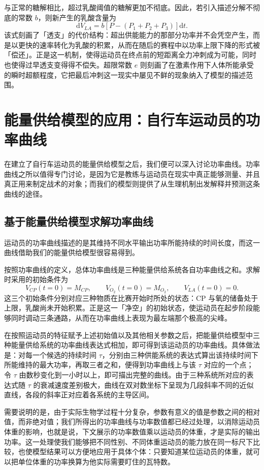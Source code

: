 \documentclass[11pt,a4paper]{ctexart}
\begin{document}
与正常的糖解相比，超过乳酸阈值的糖解更加不彻底。因此，若引入描述分解不彻底的常数 $b$，则新产生的乳酸含量为
\begin{equation}
\mathrm{d}V_{LA}=b\left[P-\left(P_1+P_2+P_3\right)\right]\mathrm{d}t.
\end{equation}
该式刻画了「透支」的代价结构：超出供能能力的那部分功率并不会凭空产生，而是以更快的速率转化为乳酸的积累，从而在随后的赛程中以功率上限下降的形式被「偿还」。正是这一机制，使得运动员在终点前的短距离全力冲刺成为可能，同时也使得过早透支变得得不偿失。超限常数 $e$ 则刻画了在激素作用下人体所能承受的瞬时超额程度，它把最后冲刺这一现实中屡见不鲜的现象纳入了模型的描述范围。
\section{能量供给模型的应用：自行车运动员的功率曲线}

在建立了自行车运动员的能量供给模型之后，我们便可以深入讨论功率曲线。功率曲线之所以值得专门讨论，是因为它是教练与运动员在现实中真正能够测量、并且真正用来制定战术的对象；而我们的模型则提供了从生理机制出发解释并预测这条曲线的途径。

\subsection{基于能量供给模型求解功率曲线}

运动员的功率曲线描述的是其维持不同水平输出功率所能持续的时间长度，而这一曲线借助我们的能量供给模型很容易得到。

按照功率曲线的定义，总体功率曲线是三种能量供给系统各自功率曲线之和。求解时采用的初始条件为
\[
V_{CP}(t=0)=M_{CP},\qquad V_{O_2}(t=0)=M_{O_2},\qquad V_{LA}(t=0)=0.
\]
这三个初始条件分别对应三种物质在比赛开始时所处的状态：CP 与氧的储备处于上限，乳酸尚未开始积累。正是这一「净空」的初始状态，使运动员在起步阶段能够同时调动三条通路，从而在功率曲线上表现为最左端那个极高的尖峰。

在按照运动员的特征赋予上述初始值以及其他相关参数之后，把能量供给模型中三种能量供给系统的功率曲线表达式相加，即可得到该运动员的功率曲线。具体做法是：对每一个候选的持续时间 $\tau$，分别由三种供能系统的表达式算出该持续时间下所能维持的最大功率，再取三者之和，便得到功率曲线上与该 $\tau$ 对应的一个点；令 $\tau$ 由数秒变化到一小时以上，即可描出完整的曲线。由于三种系统所对应的表达式随 $\tau$ 的衰减速度差别极大，曲线在双对数坐标下呈现为几段斜率不同的近似直线，各段的斜率正对应着各系统的主导区间。

需要说明的是，由于实际生物学过程十分复杂，参数有意义的值是参数之间的相对值，而非绝对值；我们所得出的功率曲线与功率数值都已经过处理，以消除运动员体重的影响，也就是说，下文展示的功率数值乘以运动员的体重，才是实际的输出功率。这一处理使我们能够把不同性别、不同体重运动员的能力放在同一标尺下比较，也使模型结果可以方便地应用于具体个体：只要知道某位运动员的体重，就可以把单位体重的功率换算为他实际需要盯住的瓦特数。
\end{document}
